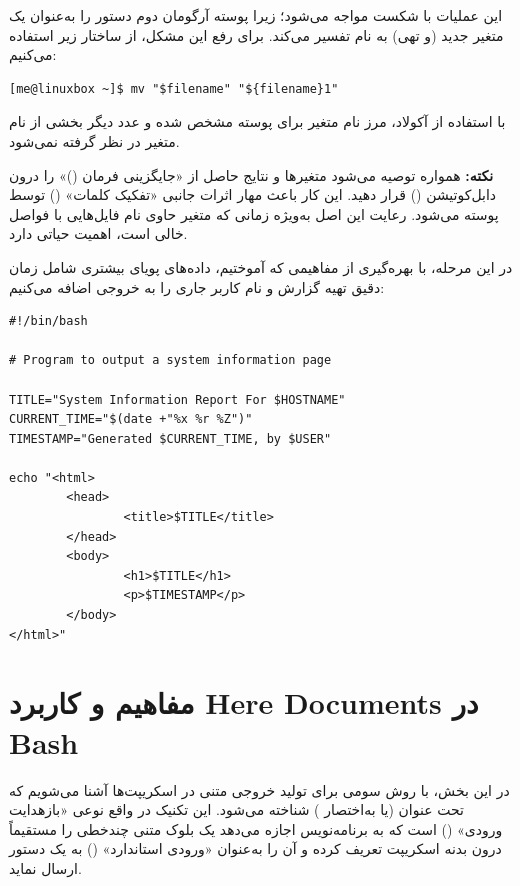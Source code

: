 این عملیات با شکست مواجه می‌شود؛ زیرا پوسته آرگومان دوم دستور  را به‌عنوان یک متغیر جدید (و تهی) به نام  تفسیر می‌کند. برای رفع این مشکل، از ساختار زیر استفاده می‌کنیم:

\begin{latin}
\begin{lstlisting}
[me@linuxbox ~]$ mv "$filename" "${filename}1"
\end{lstlisting}
\end{latin}

با استفاده از آکولاد، مرز نام متغیر برای پوسته مشخص شده و عدد  دیگر بخشی از نام متغیر در نظر گرفته نمی‌شود.

\begin{note}
\textbf{نکته:} همواره توصیه می‌شود متغیرها و نتایج حاصل از «جایگزینی فرمان ()» را درون دابل‌کوتیشن () قرار دهید. این کار باعث مهار اثرات جانبی «تفکیک کلمات» () توسط پوسته می‌شود. رعایت این اصل به‌ویژه زمانی که متغیر حاوی نام فایل‌هایی با فواصل خالی است، اهمیت حیاتی دارد.
\end{note}

در این مرحله، با بهره‌گیری از مفاهیمی که آموختیم، داده‌های پویای بیشتری شامل زمان دقیق تهیه گزارش و نام کاربر جاری را به خروجی اضافه می‌کنیم:

\begin{latin}
\begin{lstlisting}
#!/bin/bash

# Program to output a system information page

TITLE="System Information Report For $HOSTNAME"
CURRENT_TIME="$(date +"%x %r %Z")"
TIMESTAMP="Generated $CURRENT_TIME, by $USER"

echo "<html>
        <head>
                <title>$TITLE</title>
        </head>
        <body>
                <h1>$TITLE</h1>
                <p>$TIMESTAMP</p>
        </body>
</html>"
\end{lstlisting}
\end{latin}

\section{مفاهیم و کاربرد Here Documents در Bash}

در این بخش، با روش سومی برای تولید خروجی متنی در اسکریپت‌ها آشنا می‌شویم که تحت عنوان  (یا به‌اختصار ) شناخته می‌شود. این تکنیک در واقع نوعی «بازهدایت ورودی» () است که به برنامه‌نویس اجازه می‌دهد یک بلوک متنی چندخطی را مستقیماً درون بدنه اسکریپت تعریف کرده و آن را به‌عنوان «ورودی استاندارد» () به یک دستور ارسال نماید.


